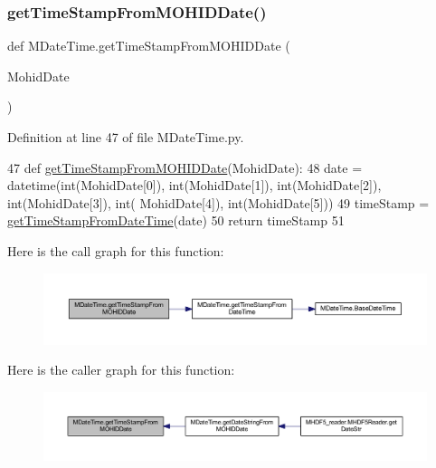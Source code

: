 \subsubsection{\texorpdfstring{get\+Time\+Stamp\+From\+M\+O\+H\+I\+D\+Date()}{getTimeStampFromMOHIDDate()}}
{\footnotesize\ttfamily def M\+Date\+Time.\+get\+Time\+Stamp\+From\+M\+O\+H\+I\+D\+Date (\begin{DoxyParamCaption}\item[{}]{Mohid\+Date }\end{DoxyParamCaption})}



Definition at line 47 of file M\+Date\+Time.\+py.


\begin{DoxyCode}
47 \textcolor{keyword}{def }\mbox{\hyperlink{namespace_m_date_time_a038322da9ec8ee2770a307c6a63187dd}{getTimeStampFromMOHIDDate}}(MohidDate):
48     date = datetime(int(MohidDate[0]), int(MohidDate[1]), int(MohidDate[2]), int(MohidDate[3]), int(
      MohidDate[4]), int(MohidDate[5]))
49     timeStamp = \mbox{\hyperlink{namespace_m_date_time_a577bd538a3fcb0bbddf8900288324eb5}{getTimeStampFromDateTime}}(date)
50     \textcolor{keywordflow}{return} timeStamp
51 
\end{DoxyCode}
Here is the call graph for this function\+:\nopagebreak
\begin{figure}[H]
\begin{center}
\leavevmode
\includegraphics[width=350pt]{namespace_m_date_time_a038322da9ec8ee2770a307c6a63187dd_cgraph}
\end{center}
\end{figure}
Here is the caller graph for this function\+:\nopagebreak
\begin{figure}[H]
\begin{center}
\leavevmode
\includegraphics[width=350pt]{namespace_m_date_time_a038322da9ec8ee2770a307c6a63187dd_icgraph}
\end{center}
\end{figure}
